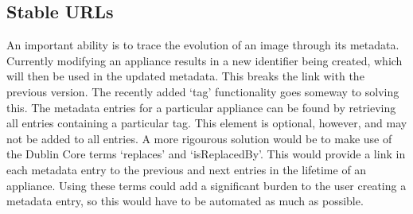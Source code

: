 \subsection{Stable URLs}

An important ability is to trace the evolution of an image through its
metadata. Currently modifying an appliance results in a new identifier
being created, which will then be used in the updated metadata. This
breaks the link with the previous version. The recently added `tag'
functionality goes someway to solving this.  The metadata entries for
a particular appliance can be found by retrieving all entries
containing a particular tag. This element is optional, however, and
may not be added to all entries. A more rigourous solution would be to
make use of the Dublin Core terms `replaces' and `isReplacedBy'. This
would provide a link in each metadata entry to the previous and next
entries in the lifetime of an appliance. Using these terms could add a
significant burden to the user creating a metadata entry, so this
would have to be automated as much as possible.
